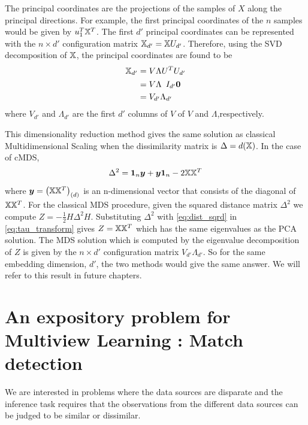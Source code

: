 \documentclass[12pt,oneside,final]{thesis}
\begin{document}
The principal coordinates are the projections of the samples of $X$ along the principal directions. For example, the first principal coordinates of the $n$ samples would be given by $u_1^T {\mathbb{X}}^T$. The  first $d'$ principal coordinates can be represented with the $n \times d'$ configuration matrix $\mathbb{X}_{d'} =  {\mathbb{X}}  U_{d'}$. Therefore, using the SVD decomposition of $\mathbb{X}$,  the principal coordinates are found to be  
\begin{align}
\mathbb{X}_{d'}&= V \Lambda U^T U_{d'} \\
       &= V  \Lambda \begin{array}{c}
I_{d'}
\bm{0}
\end{array} \\
&= V_{d'} \Lambda_{d'} 
\end{align}
where   $V_{d'}$ and $\Lambda_{d'}$  are the first $d'$ columns of $V$  of   $V$ and $\Lambda$,respectively.


This dimensionality reduction method gives the same solution as classical Multidimensional Scaling when the dissimilarity matrix is $\Delta =d(\mathbb{X})$. In the case of cMDS, $$\Delta^2=  \mbox{{\bf 1}}_n \bm{y} +\bm{y} \mbox{{\bf 1}}_n -2 \mathbb{X} \mathbb{X}^T \label{eq:dist_sqrd}$$ where $\bm{y}= \left(\mathbb{X}\mathbb{X}^T \right)_{(d)}$ is an n-dimensional vector that consists of  the diagonal of $\mathbb{X}\mathbb{X}^T$.
For the classical MDS procedure, given the squared distance matrix $\Delta^2$ we compute $Z=  - \frac{1}{2} H\Delta^2 H \label{eq:tau_transform}$. Substituting $\Delta^2$ with \eqref{eq:dist_sqrd}   in \eqref{eq:tau_transform} gives $ Z= \mathbb{X}\mathbb{X}^T$ which has the same eigenvalues as the PCA solution. The MDS solution which is computed by the eigenvalue decomposition of $Z$ is given by the $n \times d'$ configuration matrix  $V_{d'} \Lambda_{d'}$. So for the same embedding dimension, $d'$, the two methods would give the same answer. We will refer to this result in future chapters.





\chapter{An expository problem for Multiview Learning : Match detection}
\label{chap:match_detection}

 We are interested in problems where the data sources are disparate and the inference task requires that the observations from  the different data sources  can be judged to be similar or dissimilar.
  
\end{document}
